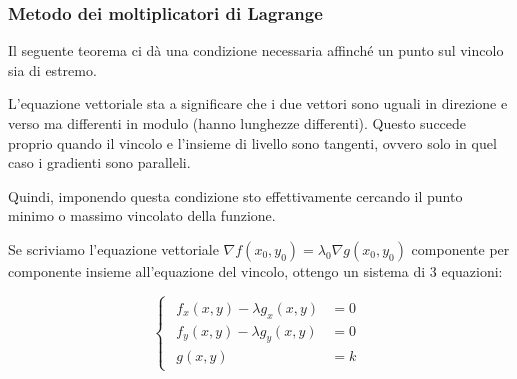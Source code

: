 \pagebreak
\subsubsection{Metodo dei moltiplicatori di Lagrange}

Il seguente teorema ci dà una condizione necessaria affinché un punto sul vincolo sia di estremo.


L'equazione vettoriale sta a significare che i due vettori sono uguali in direzione e verso ma differenti in modulo (hanno lunghezze differenti). Questo succede proprio quando il vincolo e l'insieme di livello sono tangenti, ovvero solo in quel caso i gradienti sono paralleli.

Quindi, imponendo questa condizione sto effettivamente cercando il punto minimo o massimo vincolato della funzione.

Se scriviamo l'equazione vettoriale \(\nabla f(x_0,y_0) = \lambda_0 \nabla g(x_0,y_0)\) componente per componente insieme all'equazione del vincolo, ottengo un sistema di 3 equazioni:

\begin{equation*}
    \begin{cases}
        \begin{aligned}
            f_x(x,y) - \lambda g_x(x,y) & = 0 \\
            f_y(x,y) - \lambda g_y(x,y) & = 0 \\
            g(x,y)                      & = k
        \end{aligned}
    \end{cases}
\end{equation*}

